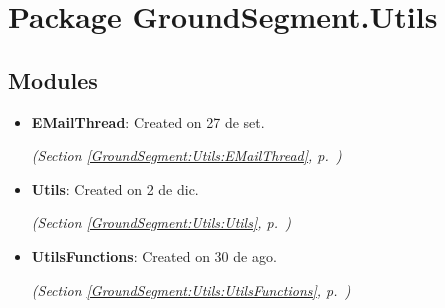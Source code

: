 %
%
%


\section{Package GroundSegment.Utils}

    \label{GroundSegment:Utils}


\subsection{Modules}

\begin{itemize}
\setlength{\parskip}{0ex}
\item \textbf{EMailThread}: Created on 27 de set.



  \textit{(Section \ref{GroundSegment:Utils:EMailThread}, p.~\pageref{GroundSegment:Utils:EMailThread})}

\item \textbf{Utils}: Created on 2 de dic.



  \textit{(Section \ref{GroundSegment:Utils:Utils}, p.~\pageref{GroundSegment:Utils:Utils})}

\item \textbf{UtilsFunctions}: Created on 30 de ago.



  \textit{(Section \ref{GroundSegment:Utils:UtilsFunctions}, p.~\pageref{GroundSegment:Utils:UtilsFunctions})}

\end{itemize}




